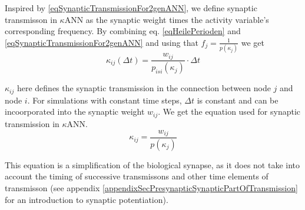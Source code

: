		Inspired by \eqref{eqSynapticTransmissionFor2genANN}, we define synaptic transmisson in $\kappa$ANN as the synaptic weight times the activity variable's corresponding frequency.
		By combining eq. \eqref{eqHeilePerioden} and \eqref{eqSynapticTransmissionFor2genANN} and using that $f_j = \frac{1}{p(\kappa_j)}$ we get
		\begin{equation}
			\kappa_{ij}(\Delta t) = \frac{ w_{ij} }{ p_{isi}(\kappa_j)} \cdot \Delta t  %
		\end{equation}
 		
		$\kappa_{ij}$ here defines the synaptic transmission in the connection between node $j$ and node $i$.
		For simulations with constant time steps, $\Delta t$ is constant and can be incoorporated into the synaptic weight $w_{ij}$.
		We get the equation used for synaptic transmission in $\kappa$ANN.
		\begin{equation}
			\kappa_{ij} = \frac{ w_{ij} }{ p(\kappa_j)}
			\label{eqSynapticTransmissionForKANN}
		\end{equation}

		This equation is a simplification of the biological synapse, as it does not take into account the timing of successive transmissons and other time elements of transmisson 
			(see appendix \ref{appendixSecPresynapticSynapticPartOfTransmission} for an introduction to synaptic potentiation). 

